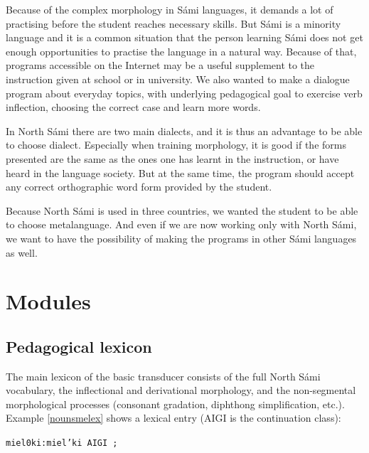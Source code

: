 \documentclass[11pt]{article}
\begin{document}
Because of the complex morphology in Sámi languages, it demands a lot of practising before the student reaches necessary skills. But Sámi is a minority language and it is a common situation that the person learning Sámi does not get enough opportunities to practise the language in a natural way. Because of that, programs accessible on the Internet may be a useful supplement to the instruction given at school or in university. We also wanted to make a dialogue program about everyday topics, with underlying pedagogical goal to exercise verb inflection, choosing the correct case and learn more words. 

In North Sámi there are two main dialects, and it is thus an advantage to be able to choose dialect. Especially when training morphology, it is good if the forms presented are the same as the ones one has learnt in the instruction, or have heard in the language society. But at the same time, the program should accept any correct orthographic word form provided by the student.

Because North Sámi is used in three countries, we wanted the student to be able to choose metalanguage. And even if we are now working only with North Sámi, we want to have the possibility of making the programs in other Sámi languages as well.



\section{Modules}

\subsection{Pedagogical lexicon}

The main lexicon of the basic transducer consists of the full North Sámi vocabulary, the inflectional and derivational morphology, and the non-segmental morphological processes (consonant gradation, diphthong simplification, etc.). Example \ref{nounsmelex} shows a lexical entry (AIGI is the continuation class):

\begin{example}\label{nounsmelex}
\begin{itemize}
\texttt{miel0ki:miel'ki AIGI ;}
\end{itemize}
\end{example}

\end{document}

